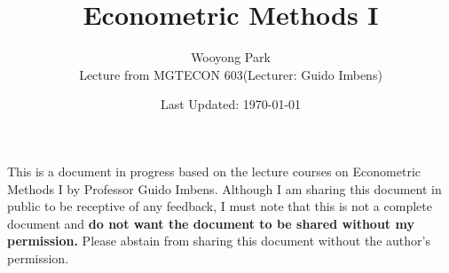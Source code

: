 \documentclass{article}
\title{Econometric Methods I}
\author{Wooyong Park\\ Lecture from MGTECON 603(Lecturer: Guido Imbens)}
\date{Last Updated: \today}
\numberwithin{equation}{subsection}
\begin{document}
\setcounter{page}{1}

\maketitle

{

This is a document in progress based on the lecture courses on Econometric Methods I by Professor Guido Imbens.
Although I am sharing this document in public to be receptive of any feedback, I must note that this is not a complete document and \textbf{do not want the document to be shared without my permission.}
Please abstain from sharing this document without the author's permission.
}



\tableofcontents

\newpage
{}
\setcounter{page}{1}






% 

% 

% 

\newpage



\newpage




\newpage
\printbibliography

\newpage
\appendix


\end{document}
